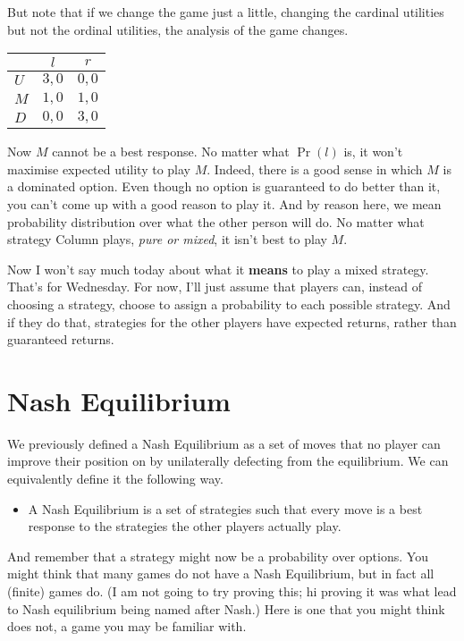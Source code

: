 \documentclass[11pt,]{article}
\providecommand{\tightlist}{%
  \setlength{\itemsep}{0pt}\setlength{\parskip}{0pt}}
\begin{document}
But note that if we change the game just a little, changing the cardinal
utilities but not the ordinal utilities, the analysis of the game
changes.

\begin{longtable}[]{@{}lcc@{}}
\toprule
& \(l\) & \(r\)\tabularnewline
\midrule
\endhead
\(U\) & \(3,0\) & \(0,0\)\tabularnewline
\(M\) & \(1,0\) & \(1,0\)\tabularnewline
\(D\) & \(0,0\) & \(3,0\)\tabularnewline
\bottomrule
\end{longtable}

Now \(M\) cannot be a best response. No matter what \(\Pr(l)\) is, it
won't maximise expected utility to play \(M\). Indeed, there is a good
sense in which \(M\) is a dominated option. Even though no option is
guaranteed to do better than it, you can't come up with a good reason to
play it. And by reason here, we mean probability distribution over what
the other person will do. No matter what strategy Column plays,
\emph{pure or mixed}, it isn't best to play \(M\).

Now I won't say much today about what it \textbf{means} to play a mixed
strategy. That's for Wednesday. For now, I'll just assume that players
can, instead of choosing a strategy, choose to assign a probability to
each possible strategy. And if they do that, strategies for the other
players have expected returns, rather than guaranteed returns.

\hypertarget{nash-equilibrium}{%
\section{Nash Equilibrium}\label{nash-equilibrium}}

We previously defined a Nash Equilibrium as a set of moves that no
player can improve their position on by unilaterally defecting from the
equilibrium. We can equivalently define it the following way.

\begin{itemize}
\tightlist
\item
  A Nash Equilibrium is a set of strategies such that every move is a
  best response to the strategies the other players actually play.
\end{itemize}

And remember that a strategy might now be a probability over options.
You might think that many games do not have a Nash Equilibrium, but in
fact all (finite) games do. (I am not going to try proving this; hi
proving it was what lead to Nash equilibrium being named after Nash.)
Here is one that you might think does not, a game you may be familiar
with.
\end{document}
